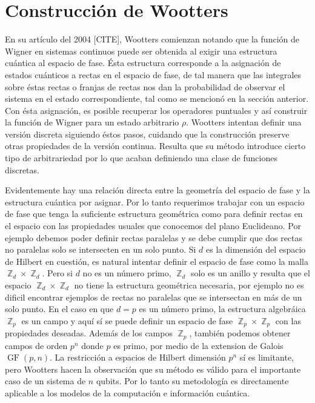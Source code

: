 \documentclass[a4paper]{report}
\DeclareMathOperator{\Z}{\mathbb{Z}}
\DeclareMathOperator{\GF}{GF}
\begin{document}
  \section{Construcción de Wootters}

  En su artículo del 2004 [CITE], Wootters comienzan notando
  que la función de Wigner en sistemas continuos puede ser
  obtenida al exigir una estructura cuántica al espacio de
  fase. Ésta estructura corresponde a la asignación de
  estados cuánticos a rectas en el espacio de fase, de tal
  manera que las integrales sobre éstas rectas o franjas de
  rectas nos dan la probabilidad de observar el sistema en
  el estado correspondiente, tal como se mencionó en la
  sección anterior. Con ésta asignación, es posible
  recuperar los operadores puntuales y así construir la
  función de Wigner para un estado arbitrario $\rho$.
  Wootters intentan definir una versión discreta siguiendo
  éstos pasos, cuidando que la construcción preserve otras
  propiedades de la versión continua.  Resulta que su método
  introduce cierto tipo de arbitrariedad por lo que acaban
  definiendo una clase de funciones discretas.

  Evidentemente hay una relación directa entre la geometría
  del espacio de fase y la estructura cuántica por asignar.
  Por lo tanto requerimos trabajar con un espacio de fase
  que tenga la suficiente estructura geométrica como para
  definir rectas en el espacio con las propiedades usuales
  que conocemos del plano Euclideano.  Por ejemplo debemos
  poder definir rectas paralelas y se debe cumplir que dos
  rectas no paralelas solo se intersecten en un solo punto.
  Si $d$ es la dimensión del espacio de Hilbert en cuestión,
  es natural intentar definir el espacio de fase como la
  malla $\Z_d \times \Z_d$. Pero si $d$ no es un número
  primo, $\Z_d$ solo es un anillo y resulta que el espacio
  $\Z_d \times \Z_d$ no tiene la estructura geométrica
  necesaria, por ejemplo no es dificil encontrar ejemplos de
  rectas no paralelas que se intersectan en más de un solo
  punto. En el caso en que $d = p$ es un número primo, la
  estructura algebráica $\Z_p$ es un campo y aquí sí se
  puede definir un espacio de fase $\Z_p \times \Z_p$ con
  las propiedades deseadas.  Además de los campos $\Z_p$,
  también podemos obtener campos de orden $p^{n}$ donde $p$
  es primo, por medio de la extension de Galois $\GF(p,n)$.
  La restricción a espacios de Hilbert dimensión $p^{n}$ sí
  es limitante, pero Wootters hacen la observación que su
  método es válido para el importante caso de un sistema de
  $n$ qubits. Por lo tanto su metodología es directamente
  aplicable a los modelos de la computación e información
  cuántica.
\end{document}
